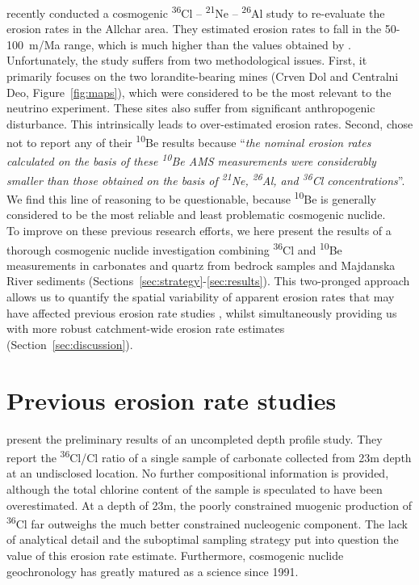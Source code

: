 \documentclass[titlepage]{article}
\begin{document}
\citet{pavicevic2016} recently conducted a cosmogenic
\textsuperscript{36}Cl -- \textsuperscript{21}Ne --
\textsuperscript{26}Al study to re-evaluate the erosion rates in the
Allchar area. They estimated erosion rates to fall in the 50-100~m/Ma
range, which is much higher than the values obtained by
\citet{dockhorn1991}. Unfortunately, the \citet{pavicevic2016} study
suffers from two methodological issues.  First, it primarily focuses
on the two lorandite-bearing mines (Crven Dol and Centralni Deo,
Figure~\ref{fig:maps}), which were considered to be the most relevant
to the neutrino experiment. These sites also suffer from significant
anthropogenic disturbance. This intrinsically leads to over-estimated
erosion rates. Second, \citet{pavicevic2016} chose not to report any
of their \textsuperscript{10}Be results because ``\textit{the nominal
  erosion rates calculated on the basis of these
  \textsuperscript{10}Be AMS measurements were considerably smaller
  than those obtained on the basis of \textsuperscript{21}Ne,
  \textsuperscript{26}Al, and \textsuperscript{36}Cl
  concentrations}''. We find this line of reasoning to be
questionable, because \textsuperscript{10}Be is generally considered
to be the most reliable and least problematic cosmogenic nuclide.\\

To improve on these previous research efforts, we here present the
results of a thorough cosmogenic nuclide investigation combining
\textsuperscript{36}Cl and \textsuperscript{10}Be measurements in
carbonates and quartz from bedrock samples and Majdanska River
sediments (Sections~\ref{sec:strategy}-\ref{sec:results}).  This
two-pronged approach allows us to quantify the spatial variability of
apparent erosion rates that may have affected previous erosion rate
studies \citep{dockhorn1991, pavicevic2016}, whilst simultaneously
providing us with more robust catchment-wide erosion rate estimates
(Section~\ref{sec:discussion}).


\section{Previous erosion rate studies}
\label{sec:previousstudies}

\citet{dockhorn1991} present the preliminary results of an uncompleted
depth profile study. They report the \textsuperscript{36}Cl/Cl ratio
of a single sample of carbonate collected from 23m depth at an
undisclosed location. No further compositional information is
provided, although the total chlorine content of the sample is
speculated to have been overestimated. At a depth of 23m, the poorly
constrained muogenic production of \textsuperscript{36}Cl far
outweighs the much better constrained nucleogenic component. The lack
of analytical detail and the suboptimal sampling strategy put into
question the value of this erosion rate estimate. Furthermore,
cosmogenic nuclide geochronology has greatly matured as a science
since 1991.\\
\end{document}
